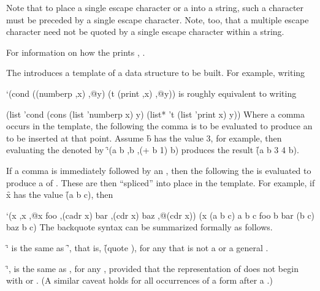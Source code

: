 Note that to place a single escape character or a  into a string,
such a character must be preceded by a single escape character.
Note, too, that a multiple escape character need not be quoted by a 
single escape character within a string.


For information on how the  prints ,
\seesection\PrintingStrings.

\endsubsection%



The  introduces a template of a data structure to be built.  
For example, writing

\code
 `(cond ((numberp ,x) ,@y) (t (print ,x) ,@y))
\endcode
is roughly equivalent to writing

\code
 (list 'cond 
       (cons (list 'numberp x) y) 
       (list* 't (list 'print x) y))
\endcode
Where a comma
occurs in the template, 
the 
following the comma is to be evaluated to produce an  to
be inserted at that point.  Assume \f{b} has the value 3, for example, then
evaluating the  denoted by \f{`(a b ,b ,(+ b 1) b)} produces
the result \f{(a b 3 4 b)}.


If a comma is immediately followed by an , 
then the  following the 
is evaluated to produce a  of .
These  are then ``spliced'' into place in the template.  For
example, if \f{x} has the value \f{(a b c)}, then

\code
 `(x ,x ,@x foo ,(cadr x) bar ,(cdr x) baz ,@(cdr x))
\EV (x (a b c) a b c foo b bar (b c) baz b c)
\endcode
The backquote syntax can be summarized formally as follows.

\beginlist
\itemitem{\bull}
\f{`} is the same as \f{'},
that is, \f{(quote )}, for any  
 that is not a  or a general .

\itemitem{\bull}
\f{`,} is the same as , for any , provided
that the representation of  does not begin with 
or .  (A similar caveat holds for all occurrences of a form after a .)

